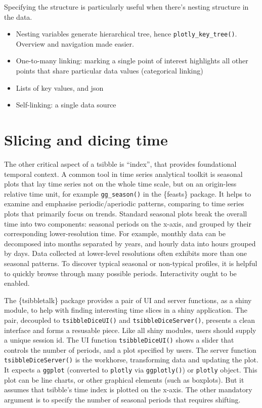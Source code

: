 Specifying the structure is particularly useful when there's nesting
structure in the data.

\begin{itemize}
\tightlist
\item
  Nesting variables generate hierarchical tree, hence
  \texttt{plotly\_key\_tree()}. Overview and navigation made easier.
\item
  One-to-many linking: marking a single point of interest highlights all
  other points that share particular data values (categorical linking)
\item
  Lists of key values, and json
\item
  Self-linking: a single data source
\end{itemize}

\hypertarget{slicing-and-dicing-time}{%
\section{Slicing and dicing time}\label{slicing-and-dicing-time}}

The other critical aspect of a tsibble is ``index'', that provides
foundational temporal context. A common tool in time series analytical
toolkit is seasonal plots that lay time series not on the whole time
scale, but on an origin-less relative time unit, for example
\texttt{gg\_season()} in the \{feasts\} package. It helps to examine and
emphasise periodic/aperiodic patterns, comparing to time series plots
that primarily focus on trends. Standard seasonal plots break the
overall time into two components: seasonal periods on the x-axis, and
grouped by their corresponding lower-resolution time. For example,
monthly data can be decomposed into months separated by years, and
hourly data into hours grouped by days. Data collected at lower-level
resolutions often exhibits more than one seasonal patterns. To discover
typical seasonal or non-typical profiles, it is helpful to quickly
browse through many possible periods. Interactivity ought to be enabled.

The \{tsibbletalk\} package provides a pair of UI and server functions,
as a shiny module, to help with finding interesting time slices in a
shiny application. The pair, decoupled to \texttt{tsibbleDiceUI()} and
\texttt{tsibbleDiceServer()}, presents a clean interface and forms a
resusable piece. Like all shiny modules, users should supply a unique
session id. The UI function \texttt{tsibbleDiceUI()} shows a slider that
controls the number of periods, and a plot specified by users. The
server function \texttt{tsibbleDiceServer()} is the workhorse,
transforming data and updating the plot. It expects a \texttt{ggplot}
(converted to \texttt{plotly} via \texttt{ggplotly()}) or
\texttt{plotly} object. This plot can be line charts, or other graphical
elements (such as boxplots). But it assumes that tsibble's time index is
plotted on the x-axis. The other mandatory argument is to specify the
number of seasonal periods that requires shifting.

